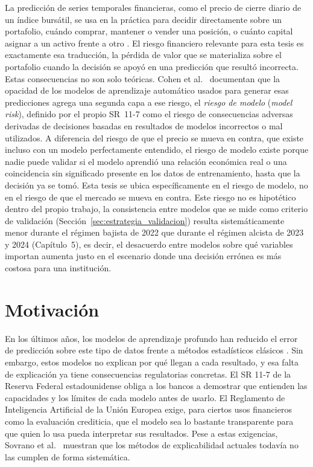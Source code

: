 La predicción de series temporales financieras, como el precio de cierre diario de un índice bursátil, se usa en la práctica para decidir directamente sobre un portafolio, cuándo comprar, mantener o vender una posición, o cuánto capital asignar a un activo frente a otro \cite{arsenault2025}. El riesgo financiero relevante para esta tesis es exactamente esa traducción, la pérdida de valor que se materializa sobre el portafolio cuando la decisión se apoyó en una predicción que resultó incorrecta. Estas consecuencias no son solo teóricas. Cohen et al.\ \cite{cohen2023blackbox} documentan que la opacidad de los modelos de aprendizaje automático usados para generar esas predicciones agrega una segunda capa a ese riesgo, el \emph{riesgo de modelo} (\emph{model risk}), definido por el propio SR~11-7 \cite{sr117} como el riesgo de consecuencias adversas derivadas de decisiones basadas en resultados de modelos incorrectos o mal utilizados. A diferencia del riesgo de que el precio se mueva en contra, que existe incluso con un modelo perfectamente entendido, el riesgo de modelo existe porque nadie puede validar si el modelo aprendió una relación económica real o una coincidencia sin significado presente en los datos de entrenamiento, hasta que la decisión ya se tomó. Esta tesis se ubica específicamente en el riesgo de modelo, no en el riesgo de que el mercado se mueva en contra. Este riesgo no es hipotético dentro del propio trabajo, la consistencia entre modelos que se mide como criterio de validación (Sección~\ref{sec:estrategia_validacion}) resulta sistemáticamente menor durante el régimen bajista de 2022 que durante el régimen alcista de 2023 y 2024 (Capítulo~5), es decir, el desacuerdo entre modelos sobre qué variables importan aumenta justo en el escenario donde una decisión errónea es más costosa para una institución.

\section{Motivación}
\label{sec:motivacion}

En los últimos años, los modelos de aprendizaje profundo han reducido el error de predicción sobre este tipo de datos frente a métodos estadísticos clásicos \cite{bhandari2022, abdulquadir2023}. Sin embargo, estos modelos no explican por qué llegan a cada resultado, y esa falta de explicación ya tiene consecuencias regulatorias concretas. El SR 11-7 de la Reserva Federal estadounidense \cite{sr117} obliga a los bancos a demostrar que entienden las capacidades y los límites de cada modelo antes de usarlo. El Reglamento de Inteligencia Artificial de la Unión Europea \cite{euaiact2024} exige, para ciertos usos financieros como la evaluación crediticia, que el modelo sea lo bastante transparente para que quien lo usa pueda interpretar sus resultados. Pese a estas exigencias, Sovrano et al.\ \cite{sovrano2026} muestran que los métodos de explicabilidad actuales todavía no las cumplen de forma sistemática.

